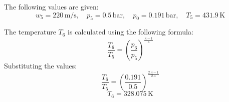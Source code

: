The following values are given:  
\[
w_5 = 220 \, \text{m/s}, \quad p_5 = 0.5 \, \text{bar}, \quad p_0 = 0.191 \, \text{bar}, \quad T_5 = 431.9 \, \text{K}
\]  

The temperature \( T_6 \) is calculated using the following formula:  
\[
\frac{T_6}{T_5} = \left( \frac{p_6}{p_5} \right)^{\frac{\kappa - 1}{\kappa}}
\]  
Substituting the values:  
\[
\frac{T_6}{T_5} = \left( \frac{0.191}{0.5} \right)^{\frac{2.4 - 1}{2.4}}
\]  
\[
T_6 = 328.075 \, \text{K}
\]